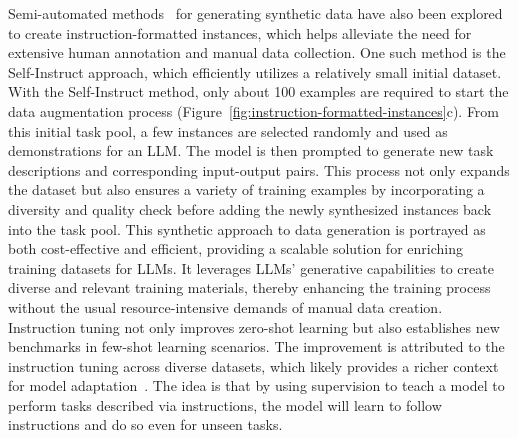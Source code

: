 Semi-automated methods~\cite{wang2022selfinstruct} for generating synthetic data have also been explored to create instruction-formatted instances, which helps alleviate the need for extensive human annotation and manual data collection.
One such method is the Self-Instruct approach, which efficiently utilizes a relatively small initial dataset.
With the Self-Instruct method, only about 100 examples are required to start the data augmentation process (Figure~\ref{fig:instruction-formatted-instances}c).
From this initial task pool, a few instances are selected randomly and used as demonstrations for an LLM. The model is then prompted to generate new task descriptions and corresponding input-output pairs.
This process not only expands the dataset but also ensures a variety of training examples by incorporating a diversity and quality check before adding the newly synthesized instances back into the task pool.
This synthetic approach to data generation is portrayed as both cost-effective and efficient, providing a scalable solution for enriching training datasets for LLMs. It leverages LLMs' generative capabilities to create diverse and relevant training materials, thereby enhancing the training process without the usual resource-intensive demands of manual data creation.
Instruction tuning not only improves zero-shot learning but also establishes new benchmarks in few-shot learning scenarios.
The improvement is attributed to the instruction tuning across diverse datasets, which likely provides a richer context for model adaptation~\cite{wei2022fine}.
The idea is that by using supervision to teach a model to perform tasks described via instructions, the model will learn to follow instructions and do so even for unseen tasks.

